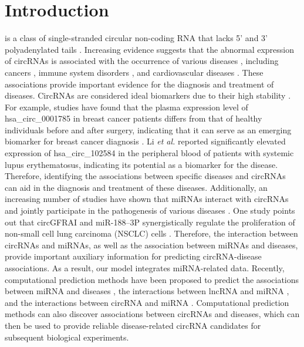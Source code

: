 \documentclass[journal,twoside,web]{ieeecolor}
\begin{document}
\section{Introduction}
\label{sec:introduction}
 is a class of single-stranded circular non-coding RNA that lacks 5' and 3' polyadenylated tails \cite{zhou2020circular}. Increasing evidence suggests that the abnormal expression of circRNAs is associated with the occurrence of various diseases \cite{abdelmohsen2017identification}, including cancers \cite{gao2019circular, li2019tumor, liang2020autophagy}, immune system disorders \cite{wang2018circibtk}, and cardiovascular diseases \cite{khan2016rbm20, siede2017identification, jin2019silencing}. 
These associations provide important evidence for the diagnosis and treatment of diseases. CircRNAs are considered ideal biomarkers due to their high stability \cite{slack2019role, shang2019novel}. For example, studies have found that the plasma expression level of hsa\_circ\_0001785 in breast cancer patients differs from that of healthy individuals before and after surgery, indicating that it can serve as an emerging biomarker for breast cancer diagnosis \cite{chen2018mdhgi}. Li {\it et al.} \cite{li2018comprehensive} reported significantly elevated expression of hsa\_circ\_102584 in the peripheral blood of patients with systemic lupus erythematosus, indicating its potential as a biomarker for the disease. %
Therefore, identifying the associations between specific diseases and circRNAs can aid in the diagnosis and treatment of these diseases. 
Additionally, an increasing number of studies have shown that miRNAs interact with circRNAs and jointly participate in the pathogenesis of various diseases \cite{huang2022circrna,shrestha2024identification}. One study points out that circGFRAI and miR-188–3P synergistically regulate the proliferation of non-small cell lung carcinoma (NSCLC) cells \cite{yao2020circgfra1}. Therefore, the interaction between circRNAs and miRNAs, as well as the association between miRNAs and diseases, provide important auxiliary information for predicting circRNA-disease associations. As a result, our model integrates miRNA-related data. %
Recently, computational prediction methods have been proposed to predict the associations between miRNA and diseases \cite{peng2024mhclmda, peng2022predicting}, the interactions between lncRNA and miRNA \cite{huang2024self, sheng2023multi, sheng2023survey}, and the interactions between circRNA and miRNA \cite{wei2025integrating, wei2024biokg}. %
Computational prediction methods can also discover associations between circRNAs and diseases, which can then be used to provide reliable disease-related circRNA candidates for subsequent biological experiments\cite{lan2023benchmarking,yang2021predicting}.
\end{document}
